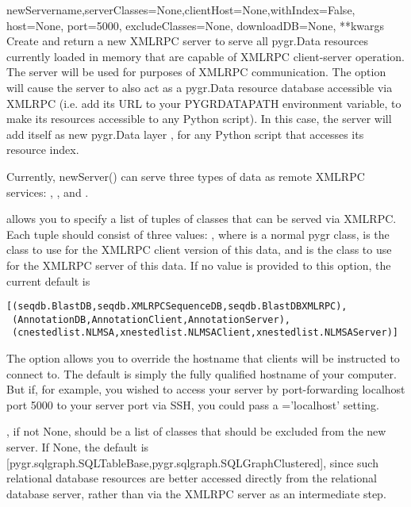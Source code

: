 \documentclass{howto}
\begin{document}
\begin{funcdesc}{newServer}{name,serverClasses=None,clientHost=None,withIndex=False, host=None, port=5000, excludeClasses=None, downloadDB=None, **kwargs}
  Create and return a new XMLRPC server to serve all pygr.Data resources 
  currently loaded in memory that are capable of XMLRPC client-server
  operation.  The server  will be used for 
  purposes of XMLRPC communication.  The  option
  will cause the server to also act as a pygr.Data resource database
  accessible via XMLRPC (i.e. add its URL to your PYGRDATAPATH environment
  variable, to make its resources accessible to any Python script).
  In this case, the server will add itself as new pygr.Data layer
  , for any Python script that accesses its resource index.

  Currently, newServer() can serve three types of data as remote
  XMLRPC services: , , and .

   allows you to specify a list of tuples of
  classes that can be served via XMLRPC.  Each tuple should consist of
  three values: , where 
   is a normal pygr class,  is the 
  class to use for the XMLRPC client version of this data, and
   is the class to use for the XMLRPC server of
  this data.  If no value is provided to this option, the current
  default is 
\begin{verbatim}
[(seqdb.BlastDB,seqdb.XMLRPCSequenceDB,seqdb.BlastDBXMLRPC),
 (AnnotationDB,AnnotationClient,AnnotationServer),
 (cnestedlist.NLMSA,xnestedlist.NLMSAClient,xnestedlist.NLMSAServer)] 
\end{verbatim}
  The  option allows you to override the hostname
  that clients will be instructed to connect to.  The default is simply
  the fully qualified hostname of your computer.  But if, for example,
  you wished to access your server by port-forwarding localhost port 5000
  to your server port via SSH, you could pass a ='localhost'
  setting.

  , if not None, should be a list of classes that
  should be excluded from the new server.  If None, the default is
  [pygr.sqlgraph.SQLTableBase,pygr.sqlgraph.SQLGraphClustered], since
  such relational database resources are better accessed directly from
  the relational database server, rather than via the XMLRPC server as
  an intermediate step.


\end{funcdesc}
\end{document}

